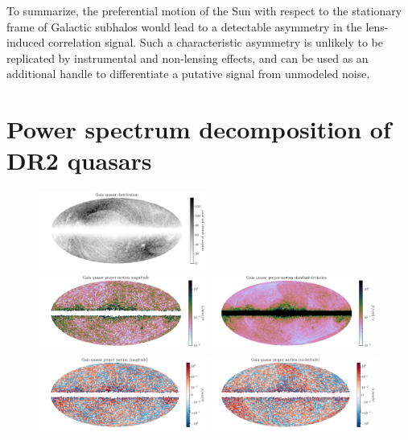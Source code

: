 \documentclass[prd,aps,twocolumn,nofootinbib,superscriptaddress,preprintnumbers,balancelastpage,longbibliography,floatfix]{revtex4-1}
\begin{document}
To summarize, the preferential motion of the Sun with respect to the stationary frame of Galactic subhalos would lead to a detectable asymmetry in the lens-induced correlation signal. Such a characteristic asymmetry is unlikely to be replicated by instrumental and non-lensing effects, and can be used as an additional handle to differentiate a putative signal from unmodeled noise.

\section{Power spectrum decomposition of \Gaia DR2 quasars}
\label{sec:gaia-quasars}

\begin{figure}[tbp]
\centering
\includegraphics[trim = 40 0 0 0, clip, width=0.49\textwidth]{plots/quasars_map.pdf} \\
\includegraphics[trim = 40 0 0 0, clip, width=0.49\textwidth]{plots/quasars_pm_mag_map.pdf}
\includegraphics[trim = 40 0 0 0, clip, width=0.49\textwidth]{plots/quasars_pm_N_map.pdf}
\includegraphics[trim = 40 0 0 0, clip, width=0.49\textwidth]{plots/quasars_pm_l_map.pdf}
\includegraphics[trim = 40 0 0 0, clip, width=0.49\textwidth]{plots/quasars_pm_b_map.pdf}

\end{figure}
\end{document}

